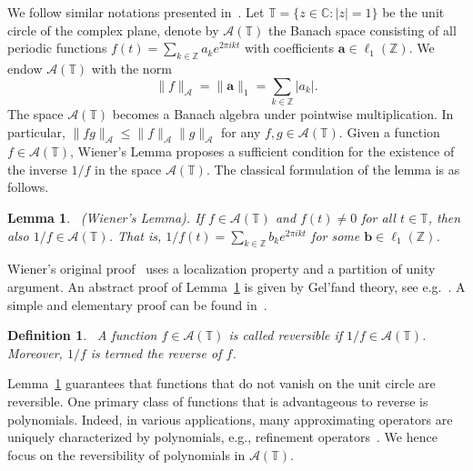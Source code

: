 \documentclass[12pt]{article}
\newtheorem{lemma}[theorem]{Lemma}
\newtheorem{defin}{Definition}[section]
\begin{document}
We follow similar notations presented in~\cite[Chapter 5]{grochenig2010wiener}. Let $\mathbb{T}=\{z\in\mathbb{C}: |z|=1\}$ be the unit circle of the complex plane, denote by $\mathcal{A}(\mathbb{T})$ the Banach space consisting of all periodic functions $f(t)=\sum_{k\in\mathbb{Z}}a_ke^{2\pi ikt}$ with coefficients $\boldsymbol{a}\in\ell_1(\mathbb{Z})$. We endow $\mathcal{A}(\mathbb{T})$ with the norm
\begin{equation*}
    \|f\|_{\mathcal{A}} = \|\boldsymbol{a}\|_1 = \sum_{k\in\mathbb{Z}}|a_k|.
\end{equation*}
The space $\mathcal{A}(\mathbb{T})$ becomes a Banach algebra under pointwise multiplication. In particular, $\|fg\|_\mathcal{A}\leq\|f\|_\mathcal{A}\|g\|_\mathcal{A}$ for any $f,g\in\mathcal{A}(\mathbb{T})$. Given a function $f\in\mathcal{A}(\mathbb{T})$, Wiener's Lemma proposes a sufficient condition for the existence of the inverse $1/f$ in the space $\mathcal{A}(\mathbb{T})$. The classical formulation of the lemma is as follows.

\begin{lemma}~\label{lem:Wiener's_lemma}
    \emph{(Wiener's Lemma)}. If $f\in\mathcal{A}(\mathbb{T})$ and $f(t)\neq 0$ for all $t\in\mathbb{T}$, then also $1/f\in\mathcal{A}(\mathbb{T})$. That is, $1/f(t) = \sum_{k\in\mathbb{Z}}b_ke^{2\pi ikt}$ for some $\boldsymbol{b}\in\ell_1(\mathbb{Z})$.
\end{lemma}

Wiener’s original proof~\cite{wiener1932tauberian} uses a localization property and a partition of unity argument. An abstract proof of Lemma~\ref{lem:Wiener's_lemma} is given by Gel’fand theory, see e.g.~\cite{kaniuth2009course}. A simple and elementary proof can be found in~\cite{newman1975simple}.

\begin{defin}~\label{defin:reversible_function}
    A function $f\in\mathcal{A}(\mathbb{T})$ is called \emph{reversible} if $1/f\in\mathcal{A}(\mathbb{T})$. Moreover, $1/f$ is termed the \emph{reverse} of $f$.
\end{defin}

Lemma~\ref{lem:Wiener's_lemma} guarantees that functions that do not vanish on the unit circle are reversible. One primary class of functions that is advantageous to reverse is polynomials. Indeed, in various applications, many approximating operators are uniquely characterized by polynomials, e.g., refinement operators~\cite{dyn1992subdivision}. We hence focus on the reversibility of polynomials in $\mathcal{A}(\mathbb{T})$.
\end{document}
